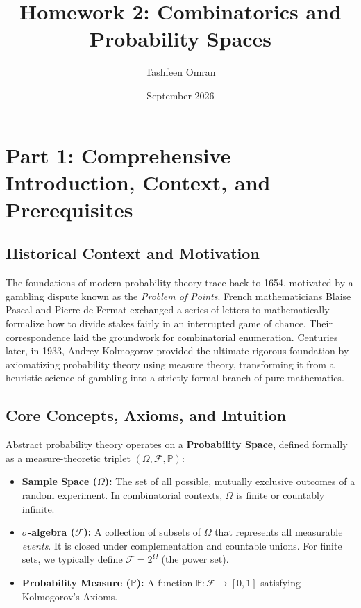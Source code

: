 \documentclass[11pt]{article}
\title{\textbf{Homework 2: Combinatorics and Probability Spaces}}
\author{Tashfeen Omran}
\date{September 2026}
\theoremstyle{definition}
\begin{document}
\maketitle
\tableofcontents
\newpage

\section{Part 1: Comprehensive Introduction, Context, and Prerequisites}

\subsection{Historical Context and Motivation}
The foundations of modern probability theory trace back to 1654, motivated by a gambling dispute known as the \textit{Problem of Points}. French mathematicians Blaise Pascal and Pierre de Fermat exchanged a series of letters to mathematically formalize how to divide stakes fairly in an interrupted game of chance. Their correspondence laid the groundwork for combinatorial enumeration. Centuries later, in 1933, Andrey Kolmogorov provided the ultimate rigorous foundation by axiomatizing probability theory using measure theory, transforming it from a heuristic science of gambling into a strictly formal branch of pure mathematics.

\subsection{Core Concepts, Axioms, and Intuition}
Abstract probability theory operates on a \textbf{Probability Space}, defined formally as a measure-theoretic triplet $(\Omega, \mathcal{F}, \mathbb{P})$:
\begin{itemize}
    \item \textbf{Sample Space ($\Omega$):} The set of all possible, mutually exclusive outcomes of a random experiment. In combinatorial contexts, $\Omega$ is finite or countably infinite.
    \item \textbf{$\sigma$-algebra ($\mathcal{F}$):} A collection of subsets of $\Omega$ that represents all measurable \textit{events}. It is closed under complementation and countable unions. For finite sets, we typically define $\mathcal{F} = 2^\Omega$ (the power set).
    \item \textbf{Probability Measure ($\mathbb{P}$):} A function $\mathbb{P}: \mathcal{F} \to [0, 1]$ satisfying Kolmogorov's Axioms.
\end{itemize}
\end{document}
